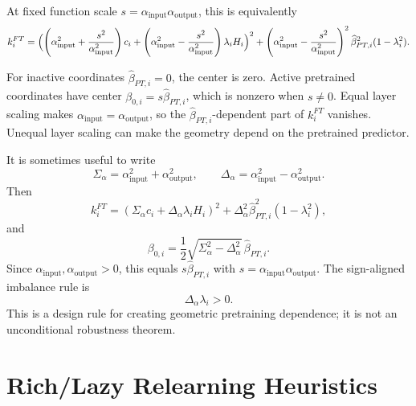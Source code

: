 \documentclass[11pt]{article}
\begin{document}
At fixed function scale \(s=\alpha_{\mathrm{input}}\alpha_{\mathrm{output}}\), this is equivalently
\begin{equation}
\begin{split}
    k_i^{FT}
    =
    \Bigl(
        \left(\alpha_{\mathrm{input}}^2+\frac{s^2}{\alpha_{\mathrm{input}}^2}\right)c_i
        +
        \left(\alpha_{\mathrm{input}}^2-\frac{s^2}{\alpha_{\mathrm{input}}^2}\right)\lambda_iH_i
    \Bigr)^2
    +
    \left(\alpha_{\mathrm{input}}^2-\frac{s^2}{\alpha_{\mathrm{input}}^2}\right)^2
    \widehat\beta_{PT,i}^2(1-\lambda_i^2).
\end{split}
\end{equation}

For inactive coordinates \(\widehat\beta_{PT,i}=0\), the center is zero. Active pretrained coordinates have center \(\beta_{0,i}=s\widehat\beta_{PT,i}\), which is nonzero when \(s\neq0\). Equal layer scaling makes \(\alpha_{\mathrm{input}}=\alpha_{\mathrm{output}}\), so the \(\widehat\beta_{PT,i}\)-dependent part of \(k_i^{FT}\) vanishes. Unequal layer scaling can make the geometry depend on the pretrained predictor.

It is sometimes useful to write
\begin{equation}
    \Sigma_\alpha=\alpha_{\mathrm{input}}^2+\alpha_{\mathrm{output}}^2,
    \qquad
    \Delta_\alpha=\alpha_{\mathrm{input}}^2-\alpha_{\mathrm{output}}^2.
\end{equation}
Then
\begin{equation}
    k_i^{FT}
    =
    (\Sigma_\alpha c_i+\Delta_\alpha\lambda_iH_i)^2
    +
    \Delta_\alpha^2\widehat\beta_{PT,i}^2(1-\lambda_i^2),
\end{equation}
and
\begin{equation}
    \beta_{0,i}
    =
    \frac12\sqrt{\Sigma_\alpha^2-\Delta_\alpha^2}\,\widehat\beta_{PT,i}.
\end{equation}
Since \(\alpha_{\mathrm{input}},\alpha_{\mathrm{output}}>0\), this equals \(s\widehat\beta_{PT,i}\) with \(s=\alpha_{\mathrm{input}}\alpha_{\mathrm{output}}\).
The sign-aligned imbalance rule is
\begin{equation}
    \Delta_\alpha\lambda_i>0.
\end{equation}
This is a design rule for creating geometric pretraining dependence; it is not an unconditional robustness theorem.

\section{Rich/Lazy Relearning Heuristics}
\label{app:rich-lazy}
\end{document}
